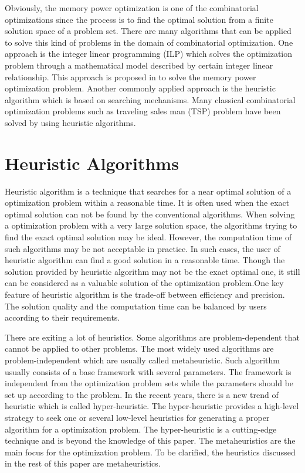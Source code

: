 	Obviously, the memory power optimization is one of the combinatorial optimizations since the process
	is to find the optimal solution from a finite solution space of a problem set. There are many algorithms
	that can be applied to solve this kind of problems in the domain of combinatorial optimization.
	One approach is the integer linear programming (ILP) which solves the optimization problem through a 
	mathematical model described by certain integer linear relationship. This approach is proposed in
	\cite{Strobel2016} to solve the memory power optimization problem. Another commonly applied approach is the
	heuristic algorithm which is based on searching mechanisms. Many classical combinatorial optimization
	problems such as traveling sales man (TSP) problem have been solved by using heuristic algorithms.
	
	\section{Heuristic Algorithms}
	\label{sec:heuristics}
	Heuristic algorithm is a technique that searches for a near optimal solution of a optimization problem within
	a reasonable time. It is often used when the exact optimal solution can not be found by the conventional
	algorithms. When solving a optimization problem with a very large solution space, the algorithms trying to 
	find the exact optimal solution may be ideal. However, the computation time of such algorithms may be not 
	acceptable in practice. In such cases, the user of heuristic algorithm can find a good solution in a reasonable
	time. Though the solution provided by heuristic algorithm may not be the exact optimal one, it still can be 
	considered as a valuable solution of the optimization problem.One key feature of heuristic algorithm is the 
	trade-off between efficiency and precision. The solution quality and the computation time can be balanced by
	users according to their requirements.
	
	There are exiting a lot of heuristics. Some algorithms are 
	problem-dependent that cannot be applied to other problems. The most widely used algorithms are problem-independent
	which are usually called metaheuristic. Such algorithm usually consists of a base framework with 
	several parameters. The framework is independent from the optimization problem sets while the parameters should be
	set up according to the problem. In the recent years, there is a new trend of heuristic which is called hyper-heuristic.
	The hyper-heuristic provides a high-level strategy to seek one or several low-level heuristics for generating a proper
	algorithm for a optimization problem. The hyper-heuristic is a cutting-edge technique and is beyond the knowledge of this
	paper. The metaheuristics are the main focus for the optimization problem. To be clarified, the heuristics discussed in the 
	rest of this paper are metaheuristics.


